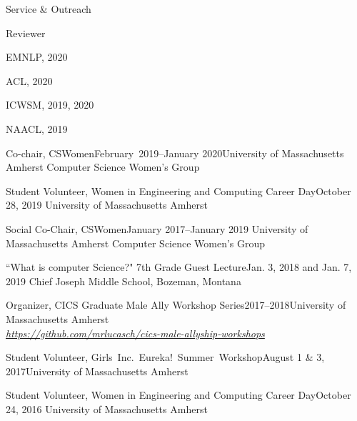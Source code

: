 \documentclass{resume} %
\begin{document}

\begin{rSection}{Service \& Outreach}

\begin{rSubsection}{Reviewer}{}{}{}
\item EMNLP, 2020 
\item ACL, 2020
\item ICWSM, 2019, 2020
\item NAACL, 2019
\end{rSubsection}

\begin{rrSubsection}
{Co-chair, CSWomen}{February~2019--January 2020}{University of Massachusetts Amherst Computer Science Women's Group}{}
\end{rrSubsection}

\begin{rrSubsection}{Student Volunteer, Women in Engineering and Computing Career Day}{October 28, 2019}
{University of Massachusetts Amherst}{}
\end{rrSubsection}

\begin{rrSubsection}{Social Co-Chair,  CSWomen}{January 2017--January 2019}
{University of Massachusetts Amherst Computer Science Women's Group}{}
\end{rrSubsection}

\begin{rrSubsection}{``What is computer Science?" 7th Grade Guest Lecture}{Jan. 3, 2018 and Jan. 7, 2019}
{Chief Joseph Middle School, Bozeman, Montana}{}
\end{rrSubsection}

\begin{rrSubsection}{Organizer, CICS Graduate Male Ally Workshop Series}{2017--2018}{University of Massachusetts Amherst \\}
{\emph{\url{https://github.com/mrlucasch/cics-male-allyship-workshops}}}
\end{rrSubsection}

\begin{rrSubsection}{Student Volunteer, Girls~Inc.~Eureka!~Summer~Workshop}{August 1 \& 3, 2017}{University of Massachusetts Amherst}{}
\end{rrSubsection}


\begin{rrSubsection}{Student Volunteer, Women in Engineering and Computing Career Day}{October 24, 2016}
{University of Massachusetts Amherst}{}
\end{rrSubsection}

\end{rSection}
\end{document}
